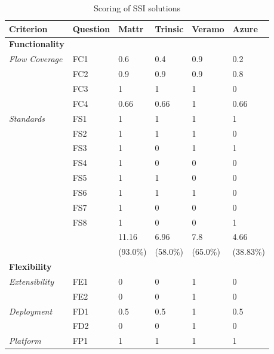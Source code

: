     \setlength\LTleft{0pt}
    \setlength\LTright{0pt}
    \begin{longtable}{@{\extracolsep{\fill}}llllll@{}}
        \caption{Scoring of \ac{SSI} solutions}
        \label{tab: scores}\\
        \toprule
        \textbf{Criterion}     & \textbf{Question} & \textbf{Mattr} & \textbf{Trinsic} & \textbf{Veramo} & \textbf{Azure} \\ \midrule
        \endfirsthead\endhead\endfoot\endlastfoot
        \textbf{Functionality} &&&&&\\
        \textit{Flow Coverage} & FC1 & 0.6 & 0.4 & 0.9 & 0.2 \\
                               & FC2 & 0.9 & 0.9 & 0.9 & 0.8 \\
                               & FC3 & 1 & 1 & 1 & 0 \\
                               & FC4 & 0.66 & 0.66 & 1 & 0.66 \\
        \textit{Standards}     & FS1 & 1 & 1 & 1 & 1 \\
                               & FS2 & 1 & 1 & 1 & 0 \\
                               & FS3 & 1 & 0 & 1 & 1 \\
                               & FS4 & 1 & 0 & 0 & 0 \\
                               & FS5 & 1 & 1 & 0 & 0 \\
                               & FS6 & 1 & 1 & 1 & 0 \\
                               & FS7 & 1 & 0 & 0 & 0 \\
                               & FS8 & 1 & 0 & 0 & 1 \\
                               \hline
                               && 11.16 & 6.96 & 7.8 & 4.66\\
                               && (93.0\%) & (58.0\%) & (65.0\%) & (38.83\%) \\                               
                               \midrule
        \textbf{Flexibility} &&&&&\\
        \textit{Extensibility} & FE1 & 0 & 0 & 1 & 0 \\
                               & FE2 & 0 & 0 & 1 & 0 \\
        \textit{Deployment}    & FD1 & 0.5 & 0.5 & 1 & 0.5 \\
                               & FD2 & 0 & 0 & 1 & 0 \\
        \textit{Platform}      & FP1 & 1 & 1 & 1 & 1 \\

\end{longtable}
